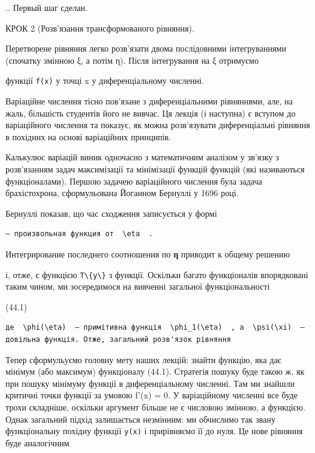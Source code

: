 \documentclass[
  ukrainian,
]{article}
\begin{document}
.. Первый шаг сделан.

КРОК 2 (Розв'язання трансформованого рівняння).

Перетворене рівняння легко розв'язати двома послідовними інтегруваннями
(спочатку змінною ξ, а потім η). Після інтегрування на ξ отримуємо

функції \texttt{f(x)} у точці x у диференціальному численні.

Варіаційне числення тісно пов'язане з диференціальними рівняннями, але,
на жаль, більшість студентів його не вивчає. Ця лекція (і наступна) є
вступом до варіаційного числення та показує, як можна розв'язувати
диференціальні рівняння в похідних на основі варіаційних принципів.

Калькулюс варіацій виник одночасно з математичним аналізом у зв'язку з
розв'язанням задач максимізації та мінімізації функцій функцій (які
називаються функціоналами). Першою задачею варіаційного числення була
задача брахістохрона, сформульована Йоганном Бернуллі у 1696 році.

Бернуллі показав, що час сходження записується у формі

\begin{verbatim}
— произвольная функция от  \eta  .
\end{verbatim}

Интегрирование последнего соотношения по \textbf{η} приводит к общему
решению

і, отже, є функцією \texttt{T\textbackslash{}\{y\textbackslash{}\}} з
функції. Оскільки багато функціоналів впорядковані таким чином, ми
зосередимося на вивченні загальної функціональності

(44.1)

\begin{verbatim}
де  \phi(\eta)  — примітивна функція  \phi_1(\eta)  , а  \psi(\xi)  — довільна функція. Отже, загальний розв'язок рівняння
\end{verbatim}

Тепер сформульуємо головну мету наших лекцій: знайти функцію, яка дає
мінімум (або максимум) функціоналу (44.1). Стратегія пошуку буде такою
ж, як при пошуку мінімуму функції в диференціальному численні. Там ми
знайшли критичні точки функції за умовою f'(x) = 0. У варіаційному
численні все буде трохи складніше, оскільки аргумент більше не є
числовою змінною, а функцією. Однак загальний підхід залишається
незмінним: ми обчислимо так звану функціональну похідну функції
\texttt{y(x)} і прирівняємо її до нуля. Це нове рівняння буде
аналогічним
\end{document}
